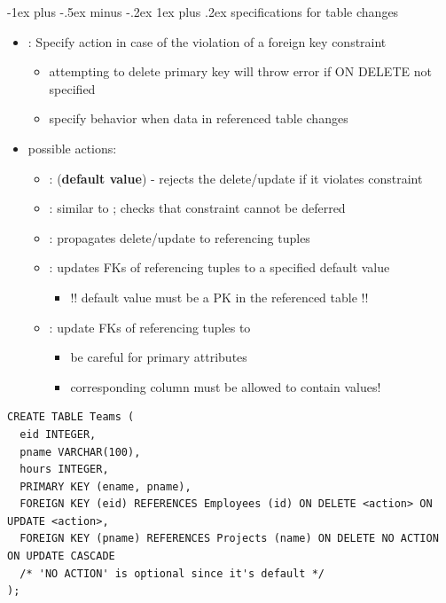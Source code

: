 \documentclass[10pt, landscape]{article}
\makeatletter
\renewcommand{\subsubsection}{\@startsection{subsubsection}{3}{0mm}%
  {-1ex plus -.5ex minus -.2ex}%
  {1ex plus .2ex}%
{\normalfont\small\bfseries}}%
\makeatother
\begin{document}
\begin{multicols}{3}
  \subsubsection{specifications for table changes}
  \begin{itemize}
    \item {}: Specify action in case of the violation of a foreign key constraint
      \begin{itemize}
        \item attempting to delete primary key will throw error if ON DELETE not specified
        \item specify behavior when data in referenced table changes
      \end{itemize}
    \item possible actions:
      \begin{itemize}
        \item {}: (\textbf{default value}) - rejects the delete/update if it violates constraint
        \item {}: similar to ; checks that constraint cannot be deferred
        \item {}: propagates delete/update to referencing tuples
        \item {}: updates FKs of referencing tuples to a specified default value
          \begin{itemize}
            \item !! default value must be a PK in the referenced table !!
          \end{itemize}
        \item {}: update FKs of referencing tuples to 
          \begin{itemize}
            \item be careful for primary attributes
            \item corresponding column must be allowed to contain  values!
          \end{itemize}
      \end{itemize}
  \end{itemize}
  \begin{lstlisting}[style=mySQL]
CREATE TABLE Teams (
  eid INTEGER,
  pname VARCHAR(100),
  hours INTEGER,
  PRIMARY KEY (ename, pname),
  FOREIGN KEY (eid) REFERENCES Employees (id) ON DELETE <action> ON UPDATE <action>,
  FOREIGN KEY (pname) REFERENCES Projects (name) ON DELETE NO ACTION ON UPDATE CASCADE 
  /* 'NO ACTION' is optional since it's default */
);
  \end{lstlisting}


\end{multicols}
\end{document}
